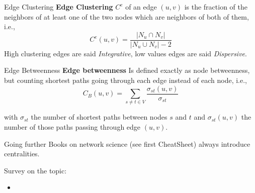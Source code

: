 \begin{textbox}{Edge Clustering}
    \textbf{Edge Clustering} $C^e$ of an edge $(u,v)$ is the fraction of the neighbors of at least one of the two nodes which are neighbors of both of them, i.e.,
    \[
        C^e(u,v)=\frac{|N_u \cap N_v|}{|N_u \cup N_v|-2}
    \]
    High clustering edges are said \textit{Integrative}, low values edges are said \textit{Dispersive}.
\end{textbox}

\begin{textbox}{Edge Betweenness}
    \textbf{Edge betweenness} Is defined exactly as node betweenness, but counting shortest paths going through each edge instead of each node, i.e.,
    \[ C_{B}(u,v)=\sum _{s\neq t\in V}{\frac {\sigma _{st}(u,v)}{\sigma _{st}}}\]

    with $\sigma _{st}$ the number of shortest paths between nodes $s$ and $t$ and $\sigma _{st}(u,v)$ the number of those paths passing through edge $(u,v)$.
\end{textbox}



\begin{textbox}{Going further}
    Books on network science (see first CheatSheet) always introduce centralities.

    Survey on the topic:
    \begin{itemize}
        \item \cite{rodrigues2019network}
    \end{itemize}
\end{textbox}